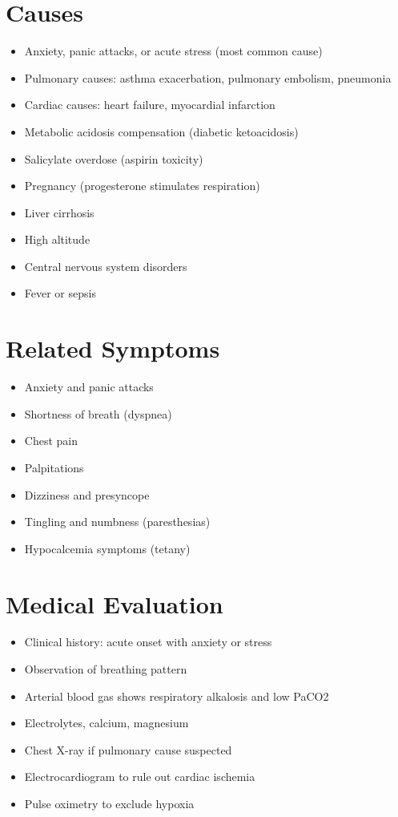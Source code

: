 \section*{Causes}
\begin{itemize}
\item Anxiety, panic attacks, or acute stress (most common cause)
\item Pulmonary causes: asthma exacerbation, pulmonary embolism, pneumonia
\item Cardiac causes: heart failure, myocardial infarction
\item Metabolic acidosis compensation (diabetic ketoacidosis)
\item Salicylate overdose (aspirin toxicity)
\item Pregnancy (progesterone stimulates respiration)
\item Liver cirrhosis
\item High altitude
\item Central nervous system disorders
\item Fever or sepsis
\end{itemize}

\section*{Related Symptoms}
\begin{itemize}
\item Anxiety and panic attacks
\item Shortness of breath (dyspnea)
\item Chest pain
\item Palpitations
\item Dizziness and presyncope
\item Tingling and numbness (paresthesias)
\item Hypocalcemia symptoms (tetany)
\end{itemize}

\section*{Medical Evaluation}
\begin{itemize}
\item Clinical history: acute onset with anxiety or stress
\item Observation of breathing pattern
\item Arterial blood gas shows respiratory alkalosis and low PaCO2
\item Electrolytes, calcium, magnesium
\item Chest X-ray if pulmonary cause suspected
\item Electrocardiogram to rule out cardiac ischemia
\item Pulse oximetry to exclude hypoxia
\end{itemize}

